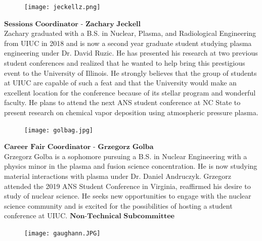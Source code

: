 \setlength\intextsep{0pt}
\begin{figure}
	\begin{center}
		\vspace{-\baselineskip}
		\texttt{[image: jeckellz.png]}
	\end{center}
\end{figure}
$\textbf{Sessions Coordinator - Zachary Jeckell}$\\
Zachary graduated with a B.S. in Nuclear, Plasma, and Radiological Engineering from UIUC in 2018 and is now a second year graduate student studying plasma engineering under Dr. David Ruzic. He has presented his research at two previous student conferences  and realized that he wanted to help bring this prestigious event to the University of Illinois. He strongly believes that the group of students at UIUC are capable of such a feat and that the University would make an excellent location for the conference because of its stellar program and wonderful faculty. He plans to attend the next ANS student conference at NC State to present research on chemical vapor deposition using atmospheric pressure plasma. 
\clearpage
\setlength\intextsep{0pt}
\begin{figure}
	\begin{center}
		\vspace{-\baselineskip}
		\texttt{[image: golbag.jpg]}
	\end{center}
\end{figure}
$\textbf{Career Fair Coordinator - Grzegorz Golba}$\\
Grzegorz Golba is a sophomore pursuing a B.S. in Nuclear Engineering with a physics minor in the plasma and fusion science concentration. He is now studying material interactions with plasma under Dr. Daniel Andruczyk. Grzegorz attended the 2019 ANS Student Conference in Virginia, reaffirmed his desire to study of nuclear science. He seeks new opportunities to engage with the nuclear science community and is excited for the possibilities of hosting a student conference at UIUC. 
\newline
\vspace{3cm}
\newline
$\textbf{Non-Technical Subcommittee}$
\setlength\intextsep{0pt}
\begin{figure}
	\begin{center}
		\vspace{-\baselineskip}
		\texttt{[image: gaughann.JPG]}
	\end{center}
\end{figure}

